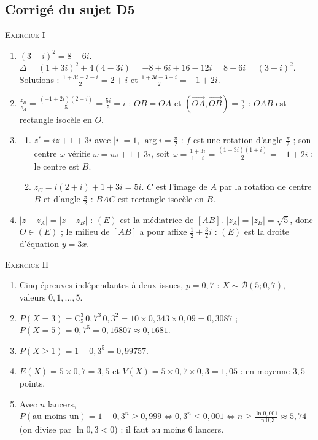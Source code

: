 \begin{corrige}
\subsection{Corrig\'e du sujet D5}
\noindent \underline{\textsc{Exercice I}}
\begin{enumerate}
\item $(3 - i)^2 = 8 - 6i$. $\Delta = (1 + 3i)^2 + 4(4 - 3i) = -8 + 6i + 16 - 12i = 8 - 6i = (3 - i)^2$.
      Solutions : $\frac{1 + 3i + 3 - i}{2} = 2 + i$ et $\frac{1 + 3i - 3 + i}{2} = -1 + 2i$.
\item $\frac{z_B}{z_A} = \frac{(-1 + 2i)(2 - i)}{5} = \frac{5i}{5} = i$ : $OB = OA$ et $(\overrightarrow{OA}, \overrightarrow{OB}) = \frac{\pi}{2}$ :
      $OAB$ est rectangle isoc\`ele en $O$.
\item \begin{enumerate}
      \item $z' = iz + 1 + 3i$ avec $|i| = 1$, $\arg i = \frac{\pi}{2}$ : $f$ est une rotation d'angle $\frac{\pi}{2}$ ; son centre $\omega$
            v\'erifie $\omega = i\omega + 1 + 3i$, soit $\omega = \frac{1 + 3i}{1 - i} = \frac{(1+3i)(1+i)}{2} = -1 + 2i$ : le centre est $B$.
      \item $z_C = i(2 + i) + 1 + 3i = 5i$. $C$ est l'image de $A$ par la rotation de centre $B$ et d'angle $\frac{\pi}{2}$ :
            $BAC$ est rectangle isoc\`ele en $B$.
      \end{enumerate}
\item $|z - z_A| = |z - z_B|$ : $(E)$ est la m\'ediatrice de $[AB]$. $|z_A| = |z_B| = \sqrt{5}$, donc $O \in (E)$ ;
      le milieu de $[AB]$ a pour affixe $\frac{1}{2} + \frac{3}{2}i$ : $(E)$ est la droite d'\'equation $y = 3x$.
\end{enumerate}

\noindent \underline{\textsc{Exercice II}}
\begin{enumerate}
\item Cinq \'epreuves ind\'ependantes \`a deux issues, $p = 0{,}7$ : $X \sim \mathscr{B}(5 ; 0{,}7)$, valeurs $0, 1, \ldots, 5$.
\item $P(X = 3) = \mathrm{C}_5^3\, 0{,}7^3\, 0{,}3^2 = 10 \times 0{,}343 \times 0{,}09 = 0{,}3087$ ; $P(X = 5) = 0{,}7^5 = 0{,}16807 \approx 0{,}1681$.
\item $P(X \geq 1) = 1 - 0{,}3^5 = 0{,}99757$.
\item $E(X) = 5 \times 0{,}7 = 3{,}5$ et $V(X) = 5 \times 0{,}7 \times 0{,}3 = 1{,}05$ : en moyenne $3{,}5$ points.
\item Avec $n$ lancers, $P(\text{au moins un}) = 1 - 0{,}3^n \geq 0{,}999 \iff 0{,}3^n \leq 0{,}001 \iff n \geq \frac{\ln 0{,}001}{\ln 0{,}3} \approx 5{,}74$
      (on divise par $\ln 0{,}3 < 0$) : il faut au moins $6$ lancers.
\end{enumerate}


\end{corrige}
